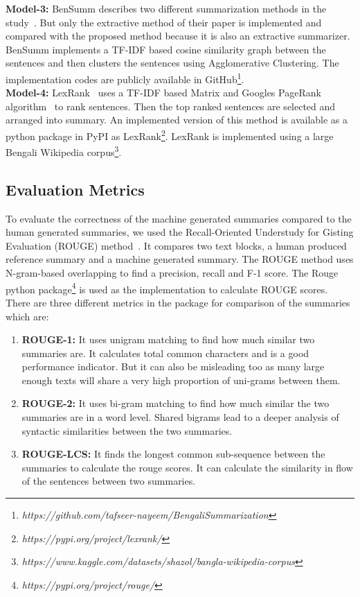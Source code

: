 \textbf{Model-3:} BenSumm describes two different summarization methods in the
study~\cite{chowdhury-etal-2021-tfidf-clustering}.
But only the extractive method of their paper is implemented and compared
with the proposed method because it is also an extractive summarizer.
BenSumm implements a TF-IDF based cosine similarity graph between the sentences and then clusters the sentences using
Agglomerative Clustering.
The implementation codes are publicly available in
GitHub\footnote{\textit{https://github.com/tafseer-nayeem/BengaliSummarization}}.\\

\textbf{Model-4:} LexRank~\cite{Erkan-lexRank-2004} uses a TF-IDF based Matrix and Googles
PageRank algorithm~\cite{page-PageRank-1999} to rank sentences.
Then the top ranked sentences are selected and arranged into summary.
An implemented version of this method is available as a python package in PyPI as
LexRank\footnote{\textit{https://pypi.org/project/lexrank/}}.
LexRank is implemented using a large Bengali Wikipedia
corpus\footnote{\textit{https://www.kaggle.com/datasets/shazol/bangla-wikipedia-corpus}}.

\subsection{Evaluation Metrics}\label{subsec:evaluation-metrics}
To evaluate the correctness of the machine generated summaries compared to the human
generated summaries, we used the Recall-Oriented Understudy for
Gisting Evaluation (ROUGE) method~\cite{lin-2004-rouge}.
It compares two text blocks, a human produced reference summary
and a machine generated summary.
The ROUGE method uses N-gram-based overlapping to find a precision, recall and F-1 score.
The Rouge python package\footnote{\textit{https://pypi.org/project/rouge/}} is
used as the implementation to calculate ROUGE scores.
There are three different metrics in the package for comparison of the summaries which are:

\begin{enumerate}
    \item \textbf{ROUGE-1:} It uses unigram matching to find how much similar two summaries are.
    It calculates total common characters and is a good performance indicator.
    But it can also be misleading too as many large enough texts
    will share a very high proportion of uni-grams between them.
    \item \textbf{ROUGE-2:} It uses bi-gram matching to find how much similar the two summaries are in a word level.
    Shared bigrams lead to a deeper analysis of syntactic similarities between the two summaries.
    \item \textbf{ROUGE-LCS:} It finds the longest common sub-sequence between the summaries to calculate
    the rouge scores.
    It can calculate the similarity in flow of the sentences between two summaries.
\end{enumerate}

